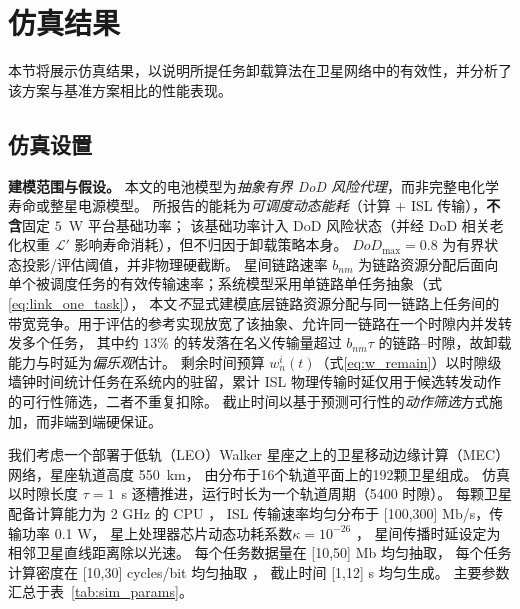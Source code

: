 \documentclass[a4paper,11pt]{article}
\begin{document}
\section{仿真结果}
\label{sec:simulation}
本节将展示仿真结果，以说明所提任务卸载算法在卫星网络中的有效性，并分析了该方案与基准方案相比的性能表现。
\subsection{仿真设置}
\label{subsec:sim_setup}

\noindent\textbf{建模范围与假设。}
本文的电池模型为\emph{抽象有界 DoD 风险代理}，而非完整电化学寿命或整星电源模型。
所报告的能耗为\emph{可调度动态能耗}（计算 $+$ ISL 传输），\textbf{不含}固定 $5$~W 平台基础功率；
该基础功率计入 DoD 风险状态（并经 DoD 相关老化权重 $\mathcal{L}'$ 影响寿命消耗），但不归因于卸载策略本身。
$DoD_{\max}=0.8$ 为有界状态投影/评估阈值，并非物理硬截断。
星间链路速率 $b_{nm}$ 为链路资源分配后面向单个被调度任务的有效传输速率；系统模型采用单链路单任务抽象（式\eqref{eq:link_one_task}），
本文\emph{不}显式建模底层链路资源分配与同一链路上任务间的带宽竞争。用于评估的参考实现放宽了该抽象、允许同一链路在一个时隙内并发转发多个任务，
其中约 $13\%$ 的转发落在名义传输量超过 $b_{nm}\tau$ 的链路--时隙，故卸载能力与时延为\emph{偏乐观}估计。
剩余时间预算 $w^i_n(t)$（式\eqref{eq:w_remain}）以时隙级墙钟时间统计任务在系统内的驻留，累计 ISL 物理传输时延仅用于候选转发动作的可行性筛选，二者不重复扣除。
截止时间以基于预测可行性的\emph{动作筛选}方式施加，而非端到端硬保证。


我们考虑一个部署于低轨（LEO）Walker 星座之上的卫星移动边缘计算（MEC）网络，星座轨道高度 550~km，
由分布于16个轨道平面上的192颗卫星组成。
仿真以时隙长度 $\tau=1$~s
逐槽推进，运行时长为一个轨道周期（5400 时隙）。
每颗卫星配备计算能力为 2 GHz 的 CPU \cite{zhang2024mhspo}，
ISL 传输速率均匀分布于 [100,300] Mb/s，传输功率 0.1 W，
星上处理器芯片动态功耗系数$\kappa=10^{-26}$ \cite{zhang2024mhspo}，
星间传播时延设定为相邻卫星直线距离除以光速。
每个任务数据量在 [10,50] Mb 均匀抽取，
每个任务计算密度在 [10,30] cycles/bit 均匀抽取 \cite{zhang2024mhspo}，
截止时间 [1,12] s 均匀生成。
主要参数汇总于表~\ref{tab:sim_params}。
\end{document}
